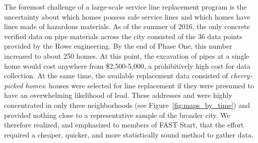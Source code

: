\documentclass[sigconf]{acmart}
\begin{document}
\begin{comment}
The economics, politics, and statistics all interacted in complex ways. As of March 2016, the FAST Start team began with a limited budget of \$25M and a legal requirement to use no more than \$5k per home. It was not clear, however, if that meant \$5k only if they successfully replaced one or both portions of service lines, or if the average cost requirement, included homes where they dug but discovered no need to replace either portion. Sending a crew to replace a home's service line that did not need replacing still costs approximately \$2.5k, due to removing concrete, refilling concrete, machine use, and labor.

But we knew we had to obtain better information that was both cheaper and more statistically representative. We had discussions with the FAST Start team, and we communicated with other water infrastructure experts about possible approaches. Performing in-home inspections, along the lines of the DEQ reports, can provide information about the private lines, but we knew that the vast majority of lead would be found in the hard-to-observe public portion.

The statistical inference, to accurately learn the general pattern of which homes have dangerous service lines, would require us to have examples of homes needing replacement and those not in need of replacement. But that does not take into account the direct cost of collecting more data or the opportunity cost of not replacing lead from another home.  Some unnecessary visits were bound to occur due to the uncertain locations of those homes requiring replacements. For instance, if the goal was to replace 5,000 homes, then more than 5,000 homes would have to be visited in order find those actually needing replacement. These would be some of the costs to learning their locations.

\end{comment}

The foremost challenge of a large-scale service line replacement program is the uncertainty about which homes possess safe service lines and which homes have lines made of hazardous materials. As of the summer of 2016, the only concrete verified data on pipe materials across the city consisted of the 36 data points provided by the Rowe engineering. By the end of Phase One, this number increased to about 250 homes. At this point, the excavation of pipes at a single home would cost anywhere from \$2,500-5,000, a prohibitively high cost for data collection. At the same time, the available replacement data consisted of \emph{cherry-picked homes}: houses were selected for line replacement if they were presumed to have an overwhelming likelihood of lead. These addresses and were highly concentrated in only three neighborhoods (see Figure~\ref{fig:maps_by_time}) and provided nothing close to a representative sample of the broader city. We therefore realized, and emphasized to members of FAST Start, that the effort required a cheaper, quicker, and more statistically sound method to gather data.
\end{document}
